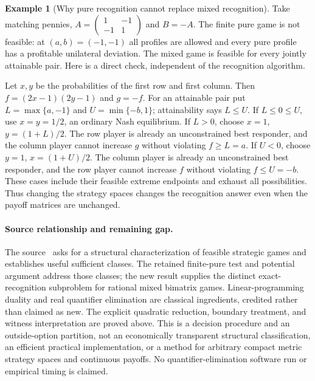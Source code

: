 \documentclass[11pt]{article}
\theoremstyle{definition}
\newtheorem{example}{Example}
\theoremstyle{remark}
\begin{document}
\begin{example}[Why pure recognition cannot replace mixed recognition]
Take matching pennies, $A=\left(\begin{smallmatrix}1&-1\\-1&1\end{smallmatrix}\right)$
and $B=-A$. The finite pure game is not feasible: at $(a,b)=(-1,-1)$ all
profiles are allowed and every pure profile has a profitable unilateral
deviation. The mixed game is feasible for every jointly attainable pair.
Here is a direct check, independent of the recognition algorithm.

Let $x,y$ be the probabilities of the first row and first column. Then
$f=(2x-1)(2y-1)$ and $g=-f$. For an attainable pair put
$L=\max\{a,-1\}$ and $U=\min\{-b,1\}$; attainability says $L\leq U$.
If $L\leq0\leq U$, use $x=y=1/2$, an ordinary Nash equilibrium.
If $L>0$, choose $x=1$, $y=(1+L)/2$. The row player is already an
unconstrained best responder, and the column player cannot increase $g$
without violating $f\geq L=a$. If $U<0$, choose $y=1$,
$x=(1+U)/2$. The column player is already an unconstrained best responder,
and the row player cannot increase $f$ without violating $f\leq U=-b$.
These cases include their feasible extreme endpoints and exhaust all
possibilities. Thus changing the strategy spaces changes the recognition
answer even when the payoff matrices are unchanged.
\end{example}

\paragraph{Source relationship and remaining gap.}
The source~\cite{source} asks for a structural characterization of feasible
strategic games and establishes useful sufficient classes. The retained
finite-pure test and potential argument address those classes; the new
result supplies the distinct exact-recognition subproblem for rational
mixed bimatrix games. Linear-programming duality and real quantifier
elimination are classical ingredients, credited rather than claimed as
new. The explicit quadratic reduction, boundary treatment, and witness
interpretation are proved above. This is a decision procedure and an
outside-option partition, not an economically transparent structural
classification, an efficient practical implementation, or a method for
arbitrary compact metric strategy spaces and continuous payoffs. No
quantifier-elimination software run or empirical timing is claimed.
\end{document}

